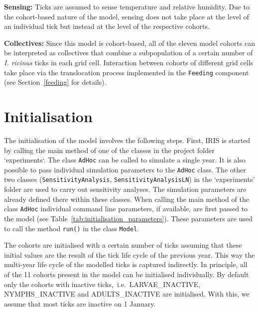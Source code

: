 \documentclass[a4paper, 11pt]{scrartcl}
\newcommand{\inlinecode}[1]{\texttt{\small #1}}
\begin{document}
\textbf{Sensing:} Ticks are assumed to sense temperature and relative humidity. Due to the cohort-based nature of the model, sensing does not take place at the level of an individual tick but instead at the level of the respective cohorts.

\textbf{Collectives:} Since this model is cohort-based, all of the eleven model cohorts can be interpreted as collectives that combine a subpopulation of a certain number of \emph{I. ricinus} ticks in each grid cell. Interaction between cohorts of different grid cells take place via the translocation process implemented in the \inlinecode{Feeding} component (see Section~\ref{feeding} for details).


\newpage
\section{Initialisation}\label{initialisation}
The initialisation of the model involves the following steps. First, IRIS is started by calling the main method of one of the classes in the project folder `experiments`. The class \inlinecode{AdHoc} can be called to simulate a single year. It is also possible to pass individual simulation parameters to the \inlinecode{AdHoc} class. The other two classes (\inlinecode{SensitivityAnalysis}, \inlinecode{SensitivityAnalysisLN}) in the `experiments' folder are used to carry out sensitivity analyses. The simulation parameters are already defined there within these classes. When calling the main method of the class \inlinecode{AdHoc} individual command line parameters, if available, are first passed to the model (see Table~\ref{tab:initialisation_parameters}). These parameters are used to call the method \inlinecode{run()} in the class \inlinecode{Model}. 

The cohorts are initialised with a certain number of ticks assuming that these initial values are the result of the tick life cycle of the previous year. This way the multi-year life cycle of the modelled ticks is captured indirectly. In principle, all of the 11 cohorts present in the model can be initialised individually. By default only the cohorts with inactive ticks,~i.e.\ LARVAE\_INACTIVE, NYMPHS\_INACTIVE and ADULTS\_INACTIVE are initialised. With this, we assume that most ticks are inactive on 1 January.
\end{document}
